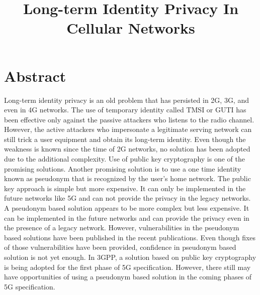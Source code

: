 \documentclass[14pt]{article}
\title{Long-term Identity Privacy In Cellular Networks}
\begin{document}
\maketitle

\section{Abstract}
Long-term identity privacy is an old problem that has persisted in 2G, 3G, and even in 4G networks. The use of temporary identity called TMSI or GUTI has been effective only against the passive attackers who listens to the radio channel. However, the active attackers who impersonate a legitimate serving network can still trick a user equipment and obtain its long-term identity. Even though the weakness is known since the time of 2G networks, no solution has been adopted due to the additional complexity. Use of public key cryptography is one of the promising solutions. Another promising solution is to use a one time identity known as pseudonym that is recognized by the user's home network. The public key approach is simple but more expensive. It can only be implemented in the future networks like 5G and can not provide the privacy in the legacy networks. A pseudonym based solution appears to be more complex but less expensive. It can be implemented in the future networks and can provide the privacy even in the presence of a legacy network. However, vulnerabilities in the pseudonym based solutions have been published in the recent publications. Even though fixes of those vulnerabilities have been provided, confidence in pseudonym based solution is not yet enough. In 3GPP, a solution based on public key cryptography is being adopted for the first phase of 5G specification. However, there still may have opportunities of using a pseudonym based solution in the coming phases of 5G specification.
\end{document}
